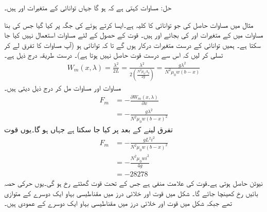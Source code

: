 حل:\quad
مساوات   کہتی ہے کہ  ہو گا جہاں توانائی کے متغیرات   اور  ہیں۔

مثال  میں  مساوات  حاصل کی جو توانائی کا کلیہ ہے۔ایسا کرتے ہوئے    کی  جگہ   پر کیا گیا جس کی بنا مساوات  میں   کے متغیرات  اور  کی بجائے    اور  ہیں۔  قوت کے حصول کے لئے  مساوات  استعمال نہیں کیا جا سکتا ہے۔ ہمیں  توانائی کے درست متغیرات درکار ہوں گے تا کہ توانائی  ہو (آپ مساوات  کا تفرق لے کر تسلی کر لیں کہ اس سے درست قوت حاصل نہیں ہوتا ہے)۔ درست طریقہ درج ذیل ہے۔
\begin{align}\label{مساوات_تبادلہ_درست_متغیرات}
W_m(x,\lambda)=\frac{\lambda^2}{2 L}=\frac{\lambda^2}{2 \left(\frac{N^2 \mu_0 A_g}{2 g} \right)}=\frac{ g \lambda^2}{N^2 \mu_0 w (b-x)}
\end{align}
مساوات  اور مساوات  مل کر درج ذیل دیتی ہیں۔
\begin{align*}
F_m&=-\frac{\partial W_m(x,\lambda)}{\partial x}\\
&=-\frac{g \lambda^2}{N^2 \mu_0 w (b-x)^2}
\end{align*}
تفرق لینے کے بعد  پر کیا جا سکتا ہے جہاں   ہو گا۔یوں قوت
\begin{align*}
F_m&=-\frac{g L^2 i^2}{N^2 \mu_0 w (b-x)^2}\\
&=-\frac{N^2 \mu_0 w i^2}{4 g}\\
&=\num{-28278}
\end{align*}
نیوٹن حاصل ہوتی ہے۔قوت کی علامت منفی ہے جس کے تحت قوت   گھٹتے  رخ ہو گی۔یوں حرکی حصہ بائیں رخ کھینچا جائے گا۔ شکل  میں قوت اور خلائی درز میں مقناطیسی بہاو ایک دوسرے کے متوازی تھے جبکہ شکل  میں قوت اور خلائی درز میں مقناطیسی بہاو ایک دوسرے کے عمودی ہیں۔ 

